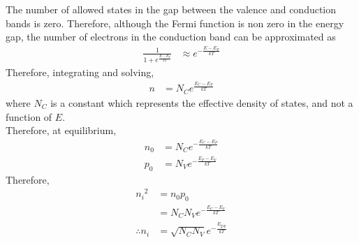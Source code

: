 \documentclass[titlepage, fleqn, a4paper, 12pt, twoside]{article}
\theoremstyle{definition}
\theoremstyle{theorem}
\begin{document}
The number of allowed states in the gap between the valence and conduction bands is zero.
Therefore, although the Fermi function is non zero in the energy gap, the number of electrons in the conduction band can be approximated as
\begin{align*}
	\frac{1}{1 + e^{\frac{E - E_F}{k T}}} & \approx e^{-\frac{E - E_F}{k T}}
\end{align*}
Therefore, integrating and solving,
\begin{align*}
	n & = N_C e^{\frac{E_C - E_F}{k T}}
\end{align*}
where $N_C$ is a constant which represents the effective density of states, and not a function of $E$.\\
Therefore, at equilibrium,
\begin{align*}
	n_0 & = N_C e^{-\frac{E_C - E_F}{k T}} \\
	p_0 & = N_V e^{-\frac{E_F - E_V}{k T}}
\end{align*}
Therefore,
\begin{align*}
	{n_i}^2        & = n_0 p_0                            \\
                       & = N_C N_V e^{-\frac{E_C - E_V}{k T}} \\
	\therefore n_i & = \sqrt{N_C N_V} e^{-\frac{E_{\text{gap}}}{k T}}
\end{align*}
\end{document}
